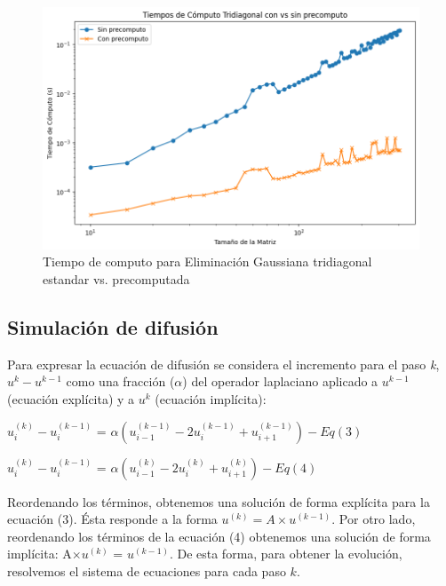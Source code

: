 \begin{figure}[H]
\centerline{\includegraphics[scale=0.45]{./img/tiempos_tridiagConVsSinP.png}}
\caption{Tiempo de computo para Eliminación Gaussiana tridiagonal estandar vs. precomputada}
\label{result_ej5_2do}
\end{figure}



\subsection{Simulación de difusión}

Para expresar la ecuación de difusión se considera el incremento para el paso \textit{k}, $u^k - u^{k-1}$ como una
fracción ($\alpha$) del operador laplaciano aplicado a $u^{k-1}$ (ecuación explícita) y a $u^{k}$ (ecuación implícita):
\begin{center}
  $u_i^{(k)} - u_i^{(k-1)}$ = $\alpha(u_{i-1}^{(k-1)} - 2u_i^{(k-1)} + u_{i+1}^{(k-1)}) - Eq (3)$
\end{center}

\begin{center}
  $u_i^{(k)} - u_i^{(k-1)}$ = $\alpha(u_{i-1}^{(k)} - 2u_i^{(k)} + u_{i+1}^{(k)}) - Eq (4)$
\end{center}

Reordenando los términos, obtenemos una solución de forma explícita para la ecuación (3). Ésta responde a la forma $u^{(k)} = A \times u^{(k-1)}$. Por otro lado, reordenando los términos de la ecuación (4) obtenemos una solución de forma implícita: A$\times u^{(k)}$ = $u^{(k-1)}$. De esta forma, para obtener la evolución, resolvemos el sistema de ecuaciones para cada paso $k$.

